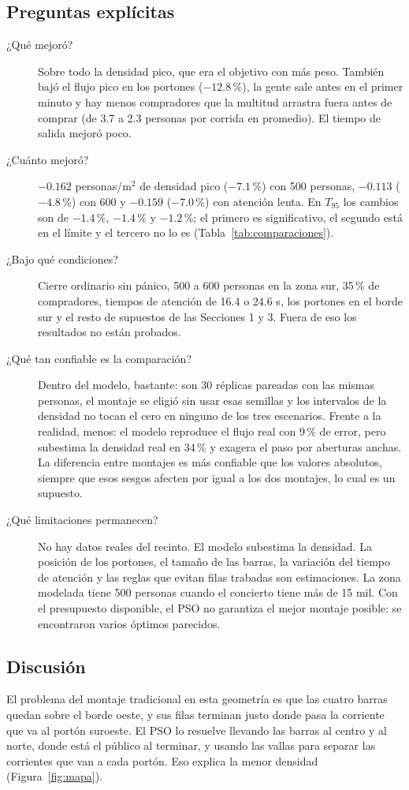 \documentclass[11pt,letterpaper]{article}
\begin{document}
\subsection{Preguntas explícitas}
\begin{description}
\item[¿Qué mejoró?] Sobre todo la densidad pico, que era el objetivo con más peso. También bajó el flujo pico en los portones ($-12.8$\,\%), la gente sale antes en el primer minuto y hay menos compradores que la multitud arrastra fuera antes de comprar (de 3.7 a 2.3 personas por corrida en promedio). El tiempo de salida mejoró poco.
\item[¿Cuánto mejoró?] $-0.162$ personas/m$^2$ de densidad pico ($-7.1$\,\%) con 500 personas, $-0.113$ ($-4.8$\,\%) con 600 y $-0.159$ ($-7.0$\,\%) con atención lenta. En $T_{95}$ los cambios son de $-1.4$\,\%, $-1.4$\,\% y $-1.2$\,\%; el primero es significativo, el segundo está en el límite y el tercero no lo es (Tabla~\ref{tab:comparaciones}).
\item[¿Bajo qué condiciones?] Cierre ordinario sin pánico, 500 a 600 personas en la zona sur, 35\,\% de compradores, tiempos de atención de 16.4 o 24.6 s, los portones en el borde sur y el resto de supuestos de las Secciones 1 y 3. Fuera de eso los resultados no están probados.
\item[¿Qué tan confiable es la comparación?] Dentro del modelo, bastante: son 30 réplicas pareadas con las mismas personas, el montaje se eligió sin usar esas semillas y los intervalos de la densidad no tocan el cero en ninguno de los tres escenarios. Frente a la realidad, menos: el modelo reproduce el flujo real con 9\,\% de error, pero subestima la densidad real en 34\,\% y exagera el paso por aberturas anchas. La diferencia entre montajes es más confiable que los valores absolutos, siempre que esos sesgos afecten por igual a los dos montajes, lo cual es un supuesto.
\item[¿Qué limitaciones permanecen?] No hay datos reales del recinto. El modelo subestima la densidad. La posición de los portones, el tamaño de las barras, la variación del tiempo de atención y las reglas que evitan filas trabadas son estimaciones. La zona modelada tiene 500 personas cuando el concierto tiene más de 15 mil. Con el presupuesto disponible, el PSO no garantiza el mejor montaje posible: se encontraron varios óptimos parecidos.
\end{description}

\subsection{Discusión}
El problema del montaje tradicional en esta geometría es que las cuatro barras quedan sobre el borde oeste, y sus filas terminan justo donde pasa la corriente que va al portón suroeste. El PSO lo resuelve llevando las barras al centro y al norte, donde está el público al terminar, y usando las vallas para separar las corrientes que van a cada portón. Eso explica la menor densidad (Figura~\ref{fig:mapa}).
\end{document}

